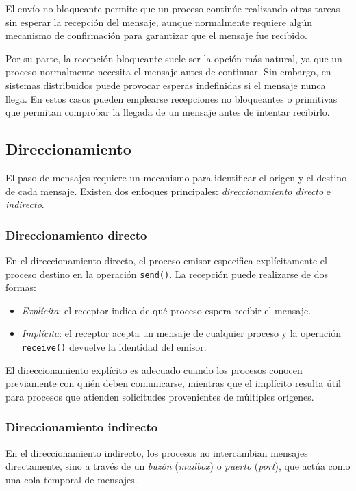 El envío no bloqueante permite que un proceso continúe realizando otras tareas sin esperar la recepción del mensaje, aunque normalmente requiere algún mecanismo de confirmación para garantizar que el mensaje fue recibido.

Por su parte, la recepción bloqueante suele ser la opción más natural, ya que un proceso normalmente necesita el mensaje antes de continuar. Sin embargo, en sistemas distribuidos puede provocar esperas indefinidas si el mensaje nunca llega. En estos casos pueden emplearse recepciones no bloqueantes o primitivas que permitan comprobar la llegada de un mensaje antes de intentar recibirlo.

\subsection{Direccionamiento}

El paso de mensajes requiere un mecanismo para identificar el origen y el destino de cada mensaje. Existen dos enfoques principales: \textit{direccionamiento directo} e \textit{indirecto}.

\subsubsection{Direccionamiento directo}

En el direccionamiento directo, el proceso emisor especifica explícitamente el proceso destino en la operación \texttt{send()}. La recepción puede realizarse de dos formas:
\begin{itemize}
  \item \textit{Explícita}: el receptor indica de qué proceso espera recibir el mensaje.
  \item \textit{Implícita}: el receptor acepta un mensaje de cualquier proceso y la operación \texttt{receive()} devuelve la identidad del emisor.
\end{itemize}

El direccionamiento explícito es adecuado cuando los procesos conocen previamente con quién deben comunicarse, mientras que el implícito resulta útil para procesos que atienden solicitudes provenientes de múltiples orígenes.

\subsubsection{Direccionamiento indirecto}

En el direccionamiento indirecto, los procesos no intercambian mensajes directamente, sino a través de un \textit{buzón} (\textit{mailbox}) o \textit{puerto} (\textit{port}), que actúa como una cola temporal de mensajes.

